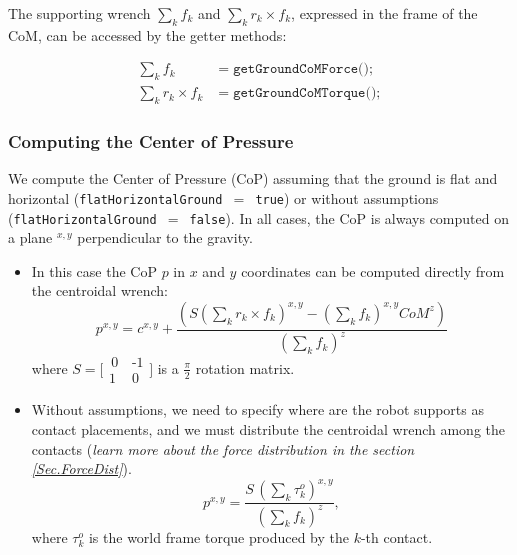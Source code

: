 \documentclass[12pt]{article}
\begin{document}
The supporting wrench $\sum_k f_k$ and $\sum_k r_k\times f_k$, expressed in the frame of the CoM, can be accessed by the getter methods:

\begin{align}
    \sum_k f_k &=\texttt{getGroundCoMForce()}; \\
    \sum_k r_k\times f_k &= \texttt{getGroundCoMTorque()};
\end{align}

\subsubsection{Computing the Center of Pressure}

We compute the Center of Pressure (CoP) assuming that the ground is flat and horizontal (\texttt{flatHorizontalGround $=$ true}) or without assumptions (\texttt{flatHorizontalGround $=$ false}). In all cases, the CoP is always computed on a plane $^{x,y}$ perpendicular to the gravity.

\begin{itemize}
    \item[] In this case the CoP $p$ in $x$ and $y$ coordinates can be computed directly from the centroidal wrench:
    \begin{equation}
        p^{x,y} = c^{x,y} + \dfrac{\left( S (\sum_k r_k\times f_k)^{x, y} - (\sum_k f_k)^{x,y}CoM^{z} \right)}{(\sum_k f_k)^z} 
    \end{equation}
    where $ S=\big[\begin{smallmatrix}\,0\, & \texttt{-}1\\1\, &0
\end{smallmatrix}\big]$ is a $\frac{\pi}{2}$ rotation matrix.

    \item[] Without assumptions, we need to specify where are the robot supports as contact placements, and we must distribute the centroidal wrench among the contacts ({\it learn more about the force distribution in the section \ref{Sec.ForceDist}}).
    \begin{equation}
        p^{x,y} = \dfrac{S\, (\sum_k {\tau^o_k})^{x,y}}{(\sum_k f_k)^z},
    \end{equation}
    where $\tau^o_k$ is the world frame torque produced by the $k$-th contact.
    
\end{itemize}
\end{document}
